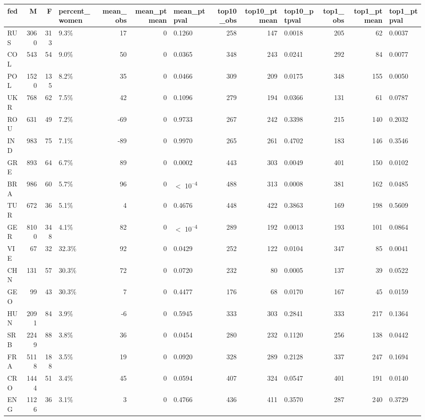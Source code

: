 
\begin{tabular}{l|r|r|l|r|r|l|r|r|l|r|r|l}
\hline
fed & M & F & percent_women & mean_obs & mean_ptmean & mean_ptpval & top10_obs & top10_ptmean & top10_ptpval & top1_obs & top1_ptmean & top1_ptpval\\
\hline
RUS & 3060 & 313 & 9.3\% & 17 & 0 & 0.1260 & 258 & 147 & 0.0018 & 205 & 62 & 0.0037\\
\hline
COL & 543 & 54 & 9.0\% & 50 & 0 & 0.0365 & 348 & 243 & 0.0241 & 292 & 84 & 0.0077\\
\hline
POL & 1520 & 135 & 8.2\% & 35 & 0 & 0.0466 & 309 & 209 & 0.0175 & 348 & 155 & 0.0050\\
\hline
UKR & 768 & 62 & 7.5\% & 42 & 0 & 0.1096 & 279 & 194 & 0.0366 & 131 & 61 & 0.0787\\
\hline
ROU & 631 & 49 & 7.2\% & -69 & 0 & 0.9733 & 267 & 242 & 0.3398 & 215 & 140 & 0.2032\\
\hline
IND & 983 & 75 & 7.1\% & -89 & 0 & 0.9970 & 265 & 261 & 0.4702 & 183 & 146 & 0.3546\\
\hline
GRE & 893 & 64 & 6.7\% & 89 & 0 & 0.0002 & 443 & 303 & 0.0049 & 401 & 150 & 0.0102\\
\hline
BRA & 986 & 60 & 5.7\% & 96 & 0 & $<$ 10\textsuperscript{--4} & 488 & 313 & 0.0008 & 381 & 162 & 0.0485\\
\hline
TUR & 672 & 36 & 5.1\% & 4 & 0 & 0.4676 & 448 & 422 & 0.3863 & 169 & 198 & 0.5609\\
\hline
GER & 8100 & 348 & 4.1\% & 82 & 0 & $<$ 10\textsuperscript{--4} & 289 & 192 & 0.0013 & 193 & 101 & 0.0864\\
\hline
VIE & 67 & 32 & 32.3\% & 92 & 0 & 0.0429 & 252 & 122 & 0.0104 & 347 & 85 & 0.0041\\
\hline
CHN & 131 & 57 & 30.3\% & 72 & 0 & 0.0720 & 232 & 80 & 0.0005 & 137 & 39 & 0.0522\\
\hline
GEO & 99 & 43 & 30.3\% & 7 & 0 & 0.4477 & 176 & 68 & 0.0170 & 167 & 45 & 0.0159\\
\hline
HUN & 2091 & 84 & 3.9\% & -6 & 0 & 0.5945 & 333 & 303 & 0.2841 & 333 & 217 & 0.1364\\
\hline
SRB & 2249 & 88 & 3.8\% & 36 & 0 & 0.0454 & 280 & 232 & 0.1120 & 256 & 138 & 0.0442\\
\hline
FRA & 5118 & 188 & 3.5\% & 19 & 0 & 0.0920 & 328 & 289 & 0.2128 & 337 & 247 & 0.1694\\
\hline
CRO & 1444 & 51 & 3.4\% & 45 & 0 & 0.0594 & 407 & 324 & 0.0547 & 401 & 191 & 0.0140\\
\hline
ENG & 1126 & 36 & 3.1\% & 3 & 0 & 0.4766 & 436 & 411 & 0.3570 & 287 & 240 & 0.3729\\

\end{tabular}
